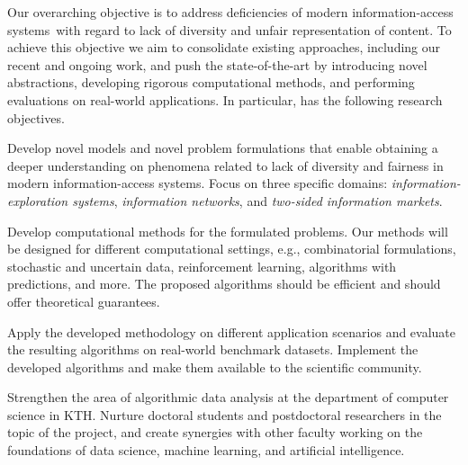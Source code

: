 \documentclass[a4paper,11pt]{article}
\begin{document}
Our overarching objective is to address deficiencies of modern information-access systems~with 
regard to lack of diversity and unfair representation of content.
To achieve this objective we aim to consolidate existing approaches, 
including our recent and ongoing work,  
and push the state-of-the-art 
by intro\-duc\-ing novel abstractions, 
developing rigorous computational methods, and 
performing evaluations on real-world applications.
In particular, {\acronym} has the following research objectives. 
%
\begin{description}
\setlength{\itemsep}{-4pt}
\item[{Models and problems:}]
Develop novel models and novel problem formulations that enable 
obtaining a deeper understanding on phenomena related 
to lack of diversity and fairness in  modern information-access systems.
Focus on three specific domains: 
\emph{information-exploration systems}, \emph{information networks}, and 
\emph{two-sided information markets}.

\item[{Algorithms:}]
Develop computational methods for the formulated problems.
Our methods will be designed for different computational settings, 
e.g., combinatorial formulations, stochastic and uncertain data, 
reinforcement learning, algorithms with predictions, and more.
The proposed algorithms should be efficient %
and should offer theoretical guarantees.


\item[{Applications:}]
Apply the developed methodology on different application scenarios 
and evaluate the resulting algorithms on real-world benchmark datasets.
Implement the developed algorithms and make them available to the scientific community.

\item[{Research environment in KTH:}]
Strengthen the area of algorithmic data analysis 
at the department of computer science in KTH. 
Nurture doctoral students and postdoctoral researchers in the topic of the project,
and create synergies with other faculty working on 
the foundations of data science, machine learning, and artificial intelligence.
\end{description}
\end{document}
